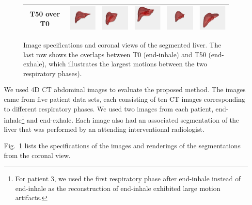 \documentclass[]{spie}  %
\begin{document}
\begin{figure}[t!]
\begin{center}
\begin{tabular}{c|c|c|c|c|c}
T50 over T0 & \includegraphics[width=0.7in]{seg_p0t0_t50} & \includegraphics[width=0.7in]{seg_p1t0_t50} & \includegraphics[width=0.7in]{seg_p2t0_t50} & \includegraphics[width=0.7in]{seg_p3t20_t50} & \includegraphics[width=0.7in]{seg_p4t0_t50}
\\
\hline
\end{tabular}
\vspace*{5mm}
\caption{Image specifications and coronal views of the segmented liver. The last row shows the overlaps between T0 (end-inhale) and T50 (end-exhale), which illustrates the largest motions between the two respiratory phases).}
\label{tab:data_specs}
\end{center}
\end{figure}

We used 4D CT abdominal images to evaluate the proposed method. The images came from five patient data sets, each consisting of ten CT images corresponding to different respiratory phases. We used two images from each patient, end-inhale\footnote{For patient 3, we used the first respiratory phase after end-inhale instead of end-inhale as the reconstruction of end-inhale exhibited large motion artifacts.} and end-exhale. Each image also had an associated segmentation of the liver that was performed by an attending interventional radiologist.

Fig.~\ref{tab:data_specs} lists the specifications of the images and renderings of the segmentations from the coronal view.
\end{document}
